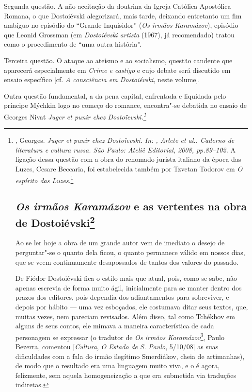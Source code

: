 Segunda questão. A não aceitação da doutrina da Igreja Católica
Apostólica Romana, o que Dostoiévski alegorizará, mais tarde,
deixando entretanto um fim ambíguo no episódio do ``Grande
Inquisidor'' (\emph{Os irmãos Karamázov}), episódio que
Leonid Grossman (em \emph{Dostoiévski artista} (1967),
já recomendado) tratou como o procedimento de ``uma outra
história''.

Terceira questão. O ataque ao ateísmo e ao socialismo, questão
candente que aparecerá especialmente em \emph{Crime e castigo}
e cujo debate será discutido em ensaio específico [cf.
\emph{A consciência em Dostoiévski}, neste volume].

Outra questão fundamental, a da pena capital, enfrentada e
liquidada pelo príncipe Mýchkin logo no começo do romance,
encontra"-se debatida no ensaio de Georges Nivat \emph{Juger
et punir chez Dostoïevski.\footnote{, Georges.
\emph{Juger et punir chez Dostoïevski. In: ,
Arlete \emph{et al.}. \emph{Caderno de literatura e cultura
russa}. São Paulo: Ateliê Editorial, 2008, pp.89--102.} A
ligação dessa questão com a obra do renomado jurista italiano
da época das Luzes, Cesare Beccaria, foi estabelecida também
por Tzvetan Todorov em \emph{O espírito das
Luzes}.\footnote{, Tzvetan. \emph{O espírito
das luzes}. São Paulo: Barcarolla, 2008.}

\chapter{\emph{Os irmãos Karamázov} e as vertentes na obra de
Dostoiévski\footnote{Publicado na Revista , nº 141, em novembro de 2009,
com o título ``Em \emph{Os irmãos Karamázov} estão reunidas as
principais vertentes da obra de Dostoiévski''.}}

Ao se ler hoje a obra de um grande autor vem de imediato o
desejo de perguntar"-se o quanto dela ficou, o quanto permanece
válido em nossos dias, que se veem continuamente desapossados de
tantos dos valores do passado.

De Fiódor Dostoiévski fica o estilo mais que atual, pois, como se sabe,
não apenas escrevia de forma muito ágil, inicialmente para se manter
dentro dos prazos dos editores, pois dependia dos adiantamentos para
sobreviver, e depois por hábito --- uma vez esboçados, ele costumava
ditar seus textos, que, muitas vezes, nem pareciam revisados. Além
disso, tal como Tchékhov em alguns de seus contos, ele mimava a maneira
característica de cada personagem se expressar (o tradutor de \emph{Os
irmãos Karamázov}\footnote{, Fiódor. \emph{Os irmãos
  Karamázov.} Tradução e posfácio Paulo Bezerra. São Paulo: Editora 34,
  2008.}, Paulo Bezerra, comentou [\emph{Cultura}, \emph{O Estado de S.
Paulo}, 5/10/08] as suas dificuldades com a fala do irmão ilegítimo
Smerdiákov, cheia de artimanhas), de modo que o resultado era uma
linguagem muito viva, e o é agora, felizmente, sem aquela homogeneização
a que era submetida via traduções indiretas.

}}
